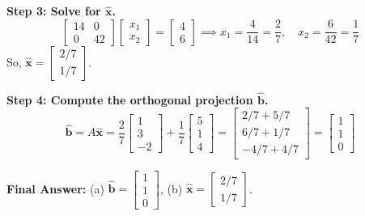 \documentclass[11pt, letterpaper]{article}
\theoremstyle{definition}
\theoremstyle{remark}
\begin{document}
\textbf{Step 3: Solve for $\hat{\mathbf{x}}$.}
\[
\begin{bmatrix} 14 & 0 \\ 0 & 42 \end{bmatrix} \begin{bmatrix} x_1 \\ x_2 \end{bmatrix} = \begin{bmatrix} 4 \\ 6 \end{bmatrix} \implies x_1 = \frac{4}{14} = \frac{2}{7}, \quad x_2 = \frac{6}{42} = \frac{1}{7}
\]
So, $\hat{\mathbf{x}} = \begin{bmatrix} 2/7 \\ 1/7 \end{bmatrix}$.

\textbf{Step 4: Compute the orthogonal projection $\hat{\mathbf{b}}$.}
\[
\hat{\mathbf{b}} = A\hat{\mathbf{x}} = \frac{2}{7} \begin{bmatrix} 1 \\ 3 \\ -2 \end{bmatrix} + \frac{1}{7} \begin{bmatrix} 5 \\ 1 \\ 4 \end{bmatrix} = \begin{bmatrix} 2/7 + 5/7 \\ 6/7 + 1/7 \\ -4/7 + 4/7 \end{bmatrix} = \begin{bmatrix} 1 \\ 1 \\ 0 \end{bmatrix}
\]

\textbf{Final Answer:} (a) $\hat{\mathbf{b}} = \begin{bmatrix} 1 \\ 1 \\ 0 \end{bmatrix}$, (b) $\hat{\mathbf{x}} = \begin{bmatrix} 2/7 \\ 1/7 \end{bmatrix}$.

\vspace{1em}
\end{document}
